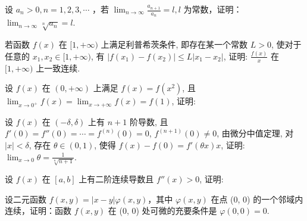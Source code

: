 设  $a_{n} > 0, n = 1, 2, 3, \cdots$ ，若  $\lim_{n \to \infty} \frac{a_{n+1}}{a_n} = l, l$  为常数，证明： $\lim_{n \to \infty} \sqrt[n]{a_n} = l.$\par
\par{}
若函数 $f(x)$ 在 $[1, +\infty)$ 上满足利普希茨条件, 即存在某一个常数 $L > 0$, 使对于任意的 $x_1, x_2 \in [1, +\infty)$, 有 $|f(x_1) - f(x_2)| \leq L|x_1 - x_2|$, 证明: $\frac{f(x)}{x}$ 在 $[1, +\infty)$ 上一致连续.\par
\par{}
\par{}
设 $f(x)$ 在 $(0, +\infty)$ 上满足 $f(x) = f(x^2)$, 且 $\lim_{x \to 0^{+}} f(x) = \lim_{x \to +\infty} f(x) = f(1)$, 证明:\par
\nopagebreak[4]
\par{}
设 $f(x)$ 在 $(- \delta, \delta)$ 上有 $n + 1$ 阶导数, 且 $f'(0) = f''(0) = \cdots = f^{(n)}(0) = 0$, $f^{(n+1)}(0) \neq 0$, 由微分中值定理, 对 $|x| < \delta$, 存在 $\theta \in (0,1)$, 使得 $f(x) - f(0) = f'(\theta x)x$, 证明: $\lim_{x \to 0} \theta = \frac{1}{\sqrt[n]{n+1}}$.\par
\par{}
\par{}
设 $f(x)$ 在 $[a, b]$ 上有二阶连续导数且 $f''(x) > 0$, 证明:\par
\nopagebreak[4]
\par{}
设二元函数 $f(x, y) = |x - y| \varphi(x, y)$，其中 $\varphi(x, y)$ 在点 (0, 0) 的一个邻域内连续，证明：函数 $f(x, y)$ 在 (0, 0) 处可微的充要条件是 $\varphi(0, 0) = 0$.\par
\par{}
